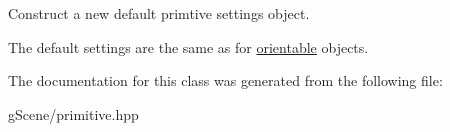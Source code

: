 Construct a new default primtive settings object. 

The default settings are the same as for \hyperlink{classgfx_1_1orientable}{orientable} objects. 

The documentation for this class was generated from the following file\-:\begin{DoxyCompactItemize}
\item 
g\-Scene/primitive.\-hpp\end{DoxyCompactItemize}

